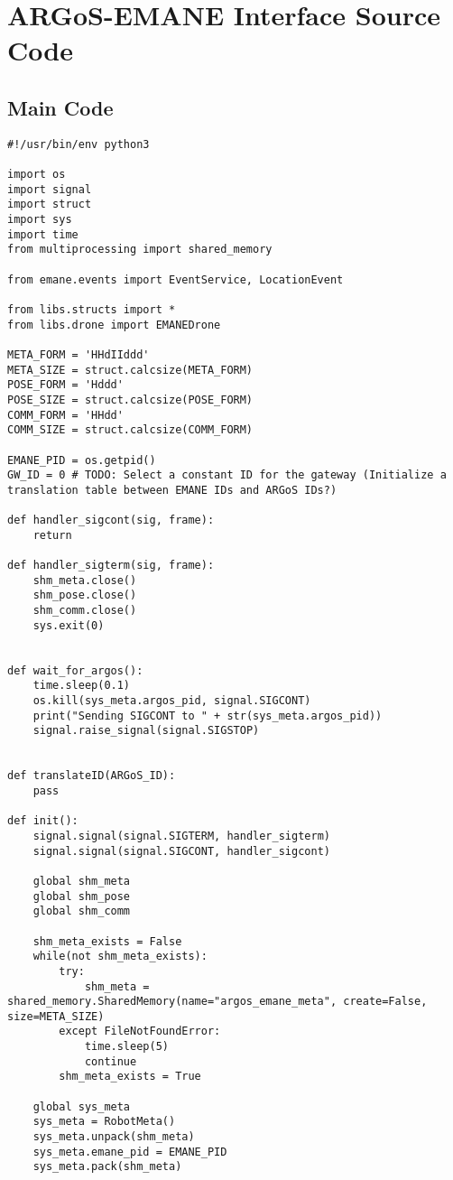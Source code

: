 \chapter{ARGoS-EMANE Interface Source Code}
\label{appendixc}
\section{Main Code}
\begin{verbatim}
#!/usr/bin/env python3

import os
import signal
import struct
import sys
import time
from multiprocessing import shared_memory

from emane.events import EventService, LocationEvent

from libs.structs import *
from libs.drone import EMANEDrone

META_FORM = 'HHdIIddd'
META_SIZE = struct.calcsize(META_FORM)
POSE_FORM = 'Hddd'
POSE_SIZE = struct.calcsize(POSE_FORM)
COMM_FORM = 'HHdd'
COMM_SIZE = struct.calcsize(COMM_FORM)

EMANE_PID = os.getpid()
GW_ID = 0 # TODO: Select a constant ID for the gateway (Initialize a translation table between EMANE IDs and ARGoS IDs?)

def handler_sigcont(sig, frame):
    return

def handler_sigterm(sig, frame):
    shm_meta.close()
    shm_pose.close()
    shm_comm.close()
    sys.exit(0)


def wait_for_argos():
    time.sleep(0.1)
    os.kill(sys_meta.argos_pid, signal.SIGCONT)
    print("Sending SIGCONT to " + str(sys_meta.argos_pid))
    signal.raise_signal(signal.SIGSTOP)


def translateID(ARGoS_ID):
    pass

def init():
    signal.signal(signal.SIGTERM, handler_sigterm)
    signal.signal(signal.SIGCONT, handler_sigcont)

    global shm_meta
    global shm_pose
    global shm_comm

    shm_meta_exists = False
    while(not shm_meta_exists):
        try:
            shm_meta = shared_memory.SharedMemory(name="argos_emane_meta", create=False, size=META_SIZE)
        except FileNotFoundError:
            time.sleep(5)
            continue
        shm_meta_exists = True

    global sys_meta
    sys_meta = RobotMeta()
    sys_meta.unpack(shm_meta)
    sys_meta.emane_pid = EMANE_PID
    sys_meta.pack(shm_meta)


\end{verbatim}
